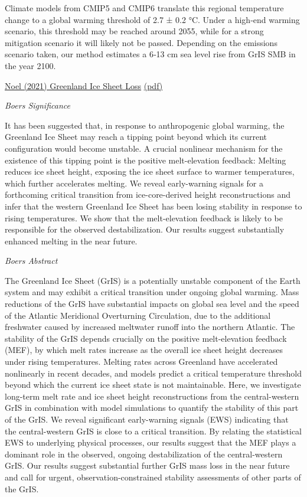 \documentclass[
]{book}
\begin{document}
Climate models from CMIP5 and CMIP6 translate this regional temperature change
to a global warming threshold of 2.7 ± 0.2 °C.
Under a high‐end warming scenario, this threshold may be reached around 2055,
while for a strong mitigation scenario it will likely not be passed.
Depending on the emissions scenario taken, our method estimates a 6‐13 cm sea level rise
from GrIS SMB in the year 2100.

\href{https://agupubs.onlinelibrary.wiley.com/doi/10.1029/2020GL090471}{Noel (2021) Greenland Ice Sheet Loss}
\href{pdf/Noel_2021_Greenland_Ice_Sheet_Loss.pdf}{(pdf)}

\emph{Boers Significance}

It has been suggested that, in response to anthropogenic global warming, the Greenland Ice Sheet may reach a tipping point beyond which its current configuration would become unstable. A crucial nonlinear mechanism for the existence of this tipping point is the positive melt-elevation feedback: Melting reduces ice sheet height, exposing the ice sheet surface to warmer temperatures, which further accelerates melting. We reveal early-warning signals for a forthcoming critical transition from ice-core-derived height reconstructions and infer that the western Greenland Ice Sheet has been losing stability in response to rising temperatures. We show that the melt-elevation feedback is likely to be responsible for the observed destabilization. Our results suggest substantially enhanced melting in the near future.

\emph{Boers Abstract}

The Greenland Ice Sheet (GrIS) is a potentially unstable component of the Earth system and may exhibit a critical transition under ongoing global warming. Mass reductions of the GrIS have substantial impacts on global sea level and the speed of the Atlantic Meridional Overturning Circulation, due to the additional freshwater caused by increased meltwater runoff into the northern Atlantic. The stability of the GrIS depends crucially on the positive melt-elevation feedback (MEF), by which melt rates increase as the overall ice sheet height decreases under rising temperatures. Melting rates across Greenland have accelerated nonlinearly in recent decades, and models predict a critical temperature threshold beyond which the current ice sheet state is not maintainable. Here, we investigate long-term melt rate and ice sheet height reconstructions from the central-western GrIS in combination with model simulations to quantify the stability of this part of the GrIS. We reveal significant early-warning signals (EWS) indicating that the central-western GrIS is close to a critical transition. By relating the statistical EWS to underlying physical processes, our results suggest that the MEF plays a dominant role in the observed, ongoing destabilization of the central-western GrIS. Our results suggest substantial further GrIS mass loss in the near future and call for urgent, observation-constrained stability assessments of other parts of the GrIS.
\end{document}
